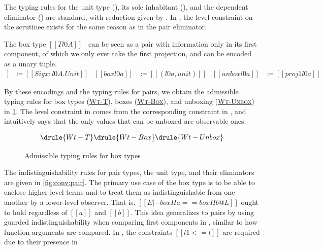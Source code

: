 \documentclass[acmsmall]{acmart}
\theoremstyle{linked}
\theoremstyle{deflinked}
\theoremstyle{acmdefinition}
\begin{document}
The typing rules for the unit type (),
its sole inhabitant (),
and the dependent eliminator () are standard,
with reduction given by .
In , the level constraint on the scrutinee exists
for the same reason as in the pair eliminator.

The box type $[[T l0 A]]$~\citep{abadi:dcc}
can be seen as a pair with information only in its first component,
of which we only ever take the first projection,
and can be encoded as a unary tuple.
%
{
\setlength{\abovedisplayskip}{0pt}
\setlength{\belowdisplayskip}{0pt}
\begin{align*}
  [[T l0 A]] &\coloneqq [[Sig x : l0 A . Unit]] &
  [[box l0 a]] &\coloneqq [[(l0 a, unit)]] &
  [[unbox l0 a]] &\coloneqq [[proj1 l0 a]]
\end{align*}
}

By these encodings and the typing rules for pairs,
we obtain the admissible typing rules for box types
(\href{https://yiyunliu.github.io/dcoi/DCOIOmega.admissible.html\#admissible.T_T}{\textsc{Wt-T}}),
boxes (\href{https://yiyunliu.github.io/dcoi/DCOIOmega.admissible.html\#admissible.T_Box}{\textsc{Wt-Box}}),
and unboxing (\href{https://yiyunliu.github.io/dcoi/DCOIOmega.admissible.html\#admissible.T_Unbox}{\textsc{Wt-Unbox}})
in \cref{fig:typing:box}.
The level constraint in  comes from the corresponding constraint in ,
and intuitively says that the only values that can be unboxed are observable ones.

\begin{figure}[h]
  \begin{gather*}
    \drule{Wt-T}
    \drule{Wt-Box}
    \drule{Wt-Unbox}
  \end{gather*}
  \caption{Admissible typing rules for box types}
  \Description{}
  \label{fig:typing:box}
\end{figure}

The indistinguishability rules for pair types, the unit type, and their eliminators
are given in \cref{fig:conv:pair}.
The primary use case of the box type is to be able to enclose higher-level terms
and to treat them as indistinguishable from one another by a lower-level observer.
That is, $[[E |- box H a == box H b @ L]]$ ought to hold regardless of $[[a]]$ and $[[b]]$.
This idea generalizes to pairs by using guarded indistinguishability
when comparing first components in ,
similar to how function arguments are compared.
In , the constraints $[[l1 <= l]]$
are required due to their presence in .
\end{document}
